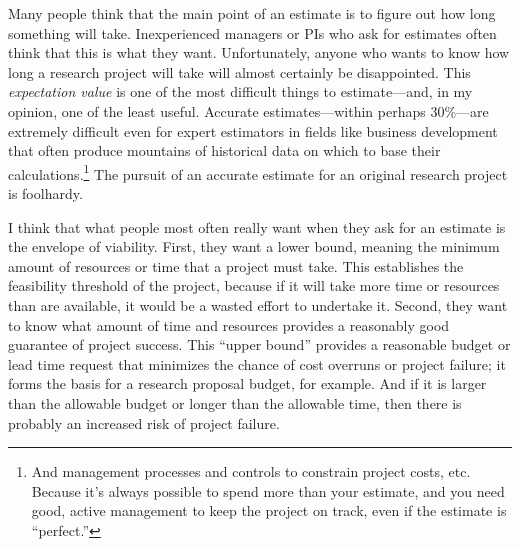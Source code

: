 \documentclass[12pt,oneside]{book}
\begin{document}
Many people think that the main point of an estimate is to figure out how long something will take. Inexperienced managers or PIs who ask for estimates often think that this is what they want. Unfortunately, anyone who wants to know how long a research project will take will almost certainly be disappointed. This \emph{expectation value} is one of the most difficult things to estimate---and, in my opinion, one of the least useful. Accurate estimates---within perhaps 30\%---are extremely difficult even for expert estimators in fields like business development that often produce mountains of historical data on which to base their calculations.\footnote{And management processes and controls to constrain project costs, etc. Because it's always possible to spend more than your estimate, and you need good, active management to keep the project on track, even if the estimate is ``perfect.''} The pursuit of an accurate estimate for an original research project is foolhardy.

I think that what people most often really want when they ask for an estimate is the envelope of viability. First, they want a lower bound, meaning the minimum amount of resources or time that a project must take. This establishes the feasibility threshold of the project, because if it will take more time or resources than are available, it would be a wasted effort to undertake it. Second, they want to know what amount of time and resources provides a reasonably good guarantee of project success. This ``upper bound'' provides a reasonable budget or lead time request that minimizes the chance of cost overruns or project failure; it forms the basis for a research proposal budget, for example. And if it is larger than the allowable budget or longer than the allowable time, then there is probably an increased risk of project failure.
\end{document}
